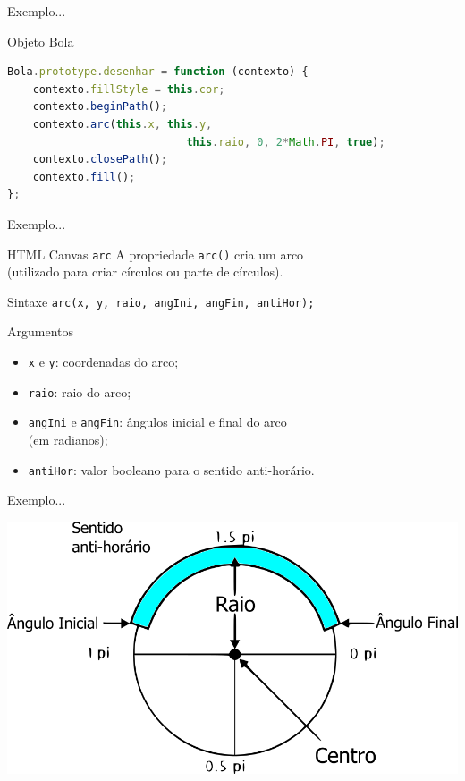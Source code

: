 \documentclass[xcolor=dvipsnames,table]{beamer}
\begin{document}
\begin{frame}[fragile]{Exemplo...}
	\begin{block}{Objeto Bola}
		\begin{lstlisting}[language=JavaScript]
Bola.prototype.desenhar = function (contexto) {
	contexto.fillStyle = this.cor;
	contexto.beginPath();
	contexto.arc(this.x, this.y, 
							this.raio, 0, 2*Math.PI, true);
	contexto.closePath();
	contexto.fill();
};
\end{lstlisting}	
	\end{block}
\end{frame}

\begin{frame}[fragile]{Exemplo...} 
	\begin{block}{HTML Canvas {\tt arc}}
		A propriedade {\tt arc()} cria um arco \\(utilizado para criar círculos ou parte de círculos). 
	\end{block}
	\begin{block}{Sintaxe}
		{\tt arc(x, y, raio, angIni, angFin, antiHor);}
	\end{block}
	\begin{block}{Argumentos}
		\begin{itemize}
			\item {\tt x} e {\tt y}: coordenadas do arco;
			\item {\tt raio}: raio do arco; 
			\item {\tt angIni} e {\tt angFin}: ângulos inicial e final do arco \\(em radianos);
			\item {\tt antiHor}: valor booleano para o sentido anti-horário.
		\end{itemize}
	\end{block}
\end{frame}

\begin{frame}{Exemplo...}
	\begin{center}
		\includegraphics[scale=0.4]{images/arc.png}
	\end{center}
\end{frame}
\end{document}
